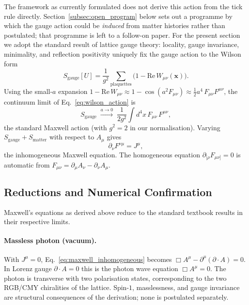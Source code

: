 The framework as currently formulated does not derive this action
from the tick rule directly. Section~\ref{subsec:open_program} below
sets out a programme by which the gauge action could be \emph{induced}
from matter histories rather than postulated; that programme is
left to a follow-on paper. For the present section we adopt the
standard result of lattice gauge theory: locality, gauge invariance,
minimality, and reflection positivity uniquely fix the gauge action
to the Wilson form~\cite{wilson1974}
\begin{equation}
    S_\text{gauge}[U] = \frac{1}{g^2}
        \sum_\text{plaquettes}\bigl(1 - \mathrm{Re}\,W_{\mu\nu}(\mathbf{x})\bigr).
    \label{eq:wilson_action}
\end{equation}
Using the small-$a$ expansion
$1 - \mathrm{Re}\,W_{\mu\nu} \approx 1 - \cos(a^2 F_{\mu\nu})
\approx \tfrac{1}{2}a^4\,F_{\mu\nu}F^{\mu\nu}$, the continuum limit
of Eq.~\eqref{eq:wilson_action} is
\begin{equation}
    S_\text{gauge} \;\xrightarrow{a\to 0}\;
        \frac{1}{2g^2}\int d^4x\,F_{\mu\nu}\,F^{\mu\nu},
    \label{eq:maxwell_action}
\end{equation}
the standard Maxwell action (with $g^2 = 2$ in our normalisation).
Varying $S_\text{gauge} + S_\text{matter}$ with respect to $A_\mu$
gives
\begin{equation}
    \boxed{\;\partial_\nu F^{\nu\mu} = J^\mu,\;}
    \label{eq:maxwell_inhomogeneous}
\end{equation}
the inhomogeneous Maxwell equation. The homogeneous equation
$\partial_{[\rho}F_{\mu\nu]} = 0$ is automatic from
$F_{\mu\nu} = \partial_\mu A_\nu - \partial_\nu A_\mu$.

\subsection{Reductions and Numerical Confirmation}
\label{subsec:em_reductions}

Maxwell's equations as derived above reduce to the standard textbook
results in their respective limits.

\paragraph{Massless photon (vacuum).}
With $J^\mu = 0$, Eq.~\eqref{eq:maxwell_inhomogeneous} becomes
$\Box A^\mu - \partial^\mu(\partial\cdot A) = 0$.
In Lorenz gauge $\partial\cdot A = 0$ this is the photon wave
equation $\Box A^\mu = 0$. The photon is transverse with two
polarisation states, corresponding to the two RGB/CMY chiralities of
the lattice. Spin-$1$, masslessness, and gauge invariance are
structural consequences of the derivation; none is postulated
separately.

